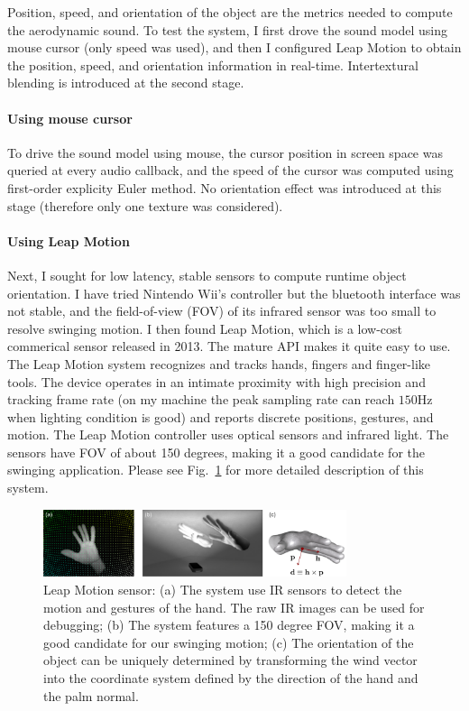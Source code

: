\documentclass[tog]{acmsiggraph}
\begin{document}
Position, speed, and orientation of the object are the metrics needed to compute the aerodynamic sound. To test the system, I first drove the sound model using mouse cursor (only speed was used), and then I configured Leap Motion to obtain the position, speed, and orientation information in real-time. Intertextural blending is introduced at the second stage.  


\paragraph{Using mouse cursor} To drive the sound model using mouse, the cursor position in screen space was queried at every audio callback, and the speed of the cursor was computed using first-order explicity Euler method. No orientation effect was introduced at this stage (therefore only one texture was considered). 


\paragraph{Using Leap Motion} Next, I sought for low latency, stable sensors to compute runtime object orientation. I have tried Nintendo Wii's controller but the bluetooth interface was not stable, and the field-of-view (FOV) of its infrared sensor was too small to resolve swinging motion. I then found Leap Motion, which is a low-cost commerical sensor released in 2013. The mature API makes it quite easy to use. The Leap Motion system recognizes and tracks hands, fingers and finger-like tools. The device operates in an intimate proximity with high precision and tracking frame rate (on my machine the peak sampling rate can reach $150$Hz when lighting condition is good) and reports discrete positions, gestures, and motion. The Leap Motion controller uses optical sensors and infrared light. The sensors have FOV of about 150 degrees, making it a good candidate for the swinging application. Please see Fig.~\ref{fig:leapmotion} for more detailed description of this system.

\begin{figure}[ht]
  \centering
  \includegraphics[width=3.5in]{images/leapmotion.pdf}
  \caption{Leap Motion sensor: (a) The system use IR sensors to detect the motion and gestures of the hand. The raw IR images can be used for debugging; (b) The system features a 150 degree FOV, making it a good candidate for our swinging motion; (c) The orientation of the object can be uniquely determined by transforming the wind vector into the coordinate system defined by the direction of the hand and the palm normal.}
  \label{fig:leapmotion}
\end{figure}
\end{document}
